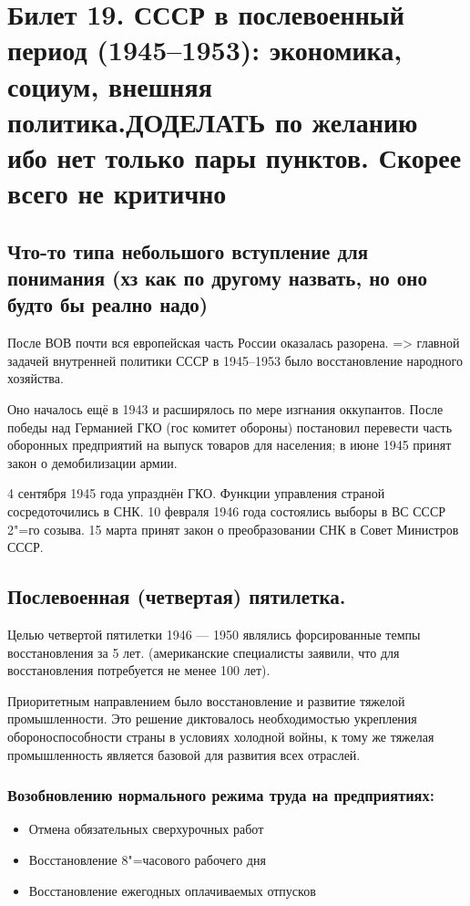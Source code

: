 \section{Билет 19. СССР в послевоенный период (1945--1953): экономика, социум, внешняя политика.\textbf{ДОДЕЛАТЬ по желанию ибо нет только пары пунктов. Скорее всего не критично
}}

\subsection{Что-то типа небольшого вступление для понимания (хз как по другому назвать, но оно будто бы реално надо)}

После ВОВ почти вся европейская часть России оказалась разорена. => главной задачей внутренней политики СССР в 1945--1953 было восстановление народного хозяйства.

Оно началось ещё в 1943 и расширялось по мере изгнания оккупантов. После победы над Германией ГКО (гос комитет обороны) постановил перевести часть оборонных предприятий на выпуск товаров для населения; в июне 1945 принят закон о демобилизации армии.

4 сентября 1945 года упразднён ГКО. Функции управления страной сосредоточились в СНК. 10 февраля 1946 года состоялись выборы в ВС СССР 2"=го созыва. 15 марта принят закон о преобразовании СНК в Совет Министров СССР.

\subsection{Послевоенная (четвертая) пятилетка.}

Целью четвертой пятилетки 1946 — 1950 являлись форсированные темпы восстановления за 5 лет. (американские специалисты заявили, что для восстановления потребуется не менее 100 лет). 

Приоритетным направлением было восстановление и развитие тяжелой промышленности. Это решение диктовалось необходимостью укрепления обороноспособности страны в условиях холодной войны, к тому же тяжелая промышленность является базовой для развития всех отраслей. 

\subsubsection{\textbf{Возобновлению нормального режима труда на предприятиях:}}

\begin{itemize}
    \item Отмена обязательных сверхурочных работ 
    \item Восстановление 8"=часового рабочего дня
    \item Восстановление ежегодных оплачиваемых отпусков
\end{itemize}

